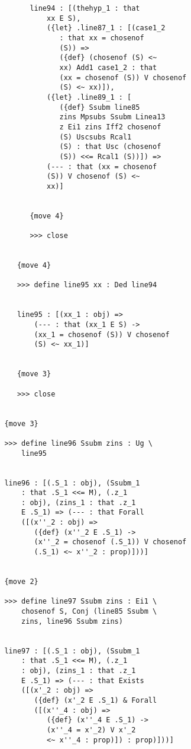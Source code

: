 \documentclass{article}
\begin{document}
\begin{verbatim}
               line94 : [(thehyp_1 : that 
                   xx E S), 
                   ({let} .line87_1 : [(case1_2 
                      : that xx = chosenof 
                      (S)) => 
                      ({def} (chosenof (S) <~ 
                      xx) Add1 case1_2 : that 
                      (xx = chosenof (S)) V chosenof 
                      (S) <~ xx)]), 
                   ({let} .line89_1 : [
                      ({def} Ssubm line85 
                      zins Mpsubs Ssubm Linea13 
                      z Ei1 zins Iff2 chosenof 
                      (S) Uscsubs Rcal1 
                      (S) : that Usc (chosenof 
                      (S)) <<= Rcal1 (S))]) => 
                   (--- : that (xx = chosenof 
                   (S)) V chosenof (S) <~ 
                   xx)]


               {move 4}

               >>> close


            {move 4}

            >>> define line95 xx : Ded line94


            line95 : [(xx_1 : obj) => 
                (--- : that (xx_1 E S) -> 
                (xx_1 = chosenof (S)) V chosenof 
                (S) <~ xx_1)]


            {move 3}

            >>> close


         {move 3}

         >>> define line96 Ssubm zins : Ug \
             line95


         line96 : [(.S_1 : obj), (Ssubm_1 
             : that .S_1 <<= M), (.z_1 
             : obj), (zins_1 : that .z_1 
             E .S_1) => (--- : that Forall 
             ([(x''_2 : obj) => 
                ({def} (x''_2 E .S_1) -> 
                (x''_2 = chosenof (.S_1)) V chosenof 
                (.S_1) <~ x''_2 : prop)]))]


         {move 2}

         >>> define line97 Ssubm zins : Ei1 \
             chosenof S, Conj (line85 Ssubm \
             zins, line96 Ssubm zins)


         line97 : [(.S_1 : obj), (Ssubm_1 
             : that .S_1 <<= M), (.z_1 
             : obj), (zins_1 : that .z_1 
             E .S_1) => (--- : that Exists 
             ([(x'_2 : obj) => 
                ({def} (x'_2 E .S_1) & Forall 
                ([(x''_4 : obj) => 
                   ({def} (x''_4 E .S_1) -> 
                   (x''_4 = x'_2) V x'_2 
                   <~ x''_4 : prop)]) : prop)]))]



\end{verbatim}
\end{document}
